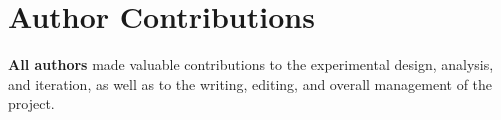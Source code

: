 


\section*{Author Contributions}

\textbf{All authors} made valuable contributions to the experimental design, analysis, and iteration, as well as to the writing, editing, and overall management of the project.



